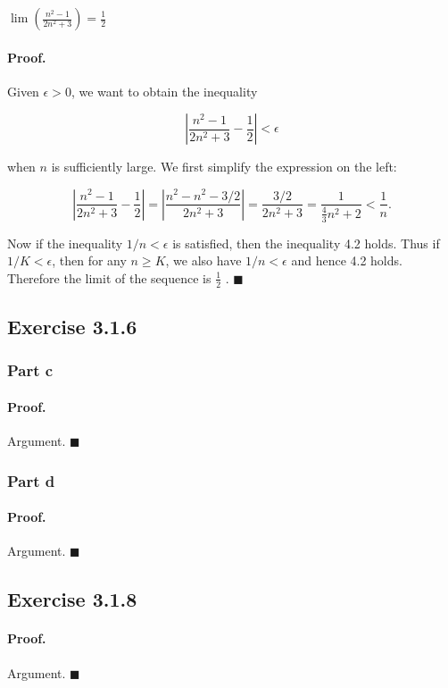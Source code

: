 \documentclass[paper=a4, fontsize=11pt]{scrartcl} %
\numberwithin{equation}{section} %
\numberwithin{figure}{section} %
\numberwithin{table}{section} %
\begin{document}
$\lim\left(\frac{n^2 - 1}{2n^2 + 3}\right) = \frac{1}{2}$

\paragraph{Proof.} Given $\epsilon > 0$, we want to obtain the inequality

\begin{equation}
\left| \frac{n^2 - 1}{2n^2 + 3} - \frac{1}{2}\right| < \epsilon
\end{equation}

when $n$ is sufficiently large. We first simplify the expression on the left:

\begin{equation*}
\left| \frac{n^2 - 1}{2n^2 + 3} - \frac{1}{2}\right| = \left|\frac{n^2 - n^2 - 3/2}{2n^2 + 3}\right| = \frac{3/2}{2n^2 + 3} = \frac{1}{\frac{4}{3}n^2 + 2} < \frac{1}{n}.
\end{equation*}

Now if the inequality $1/n < \epsilon$ is satisfied, then the inequality 4.2 holds. Thus if $1/K < \epsilon$, then for any $n \geq K$, we also have $1/n < \epsilon$ and hence 4.2 holds. Therefore the limit of the sequence is $\frac{1}{2}$ . $\blacksquare$\\

\subsection*{Exercise 3.1.6}
\subsubsection*{Part c}
\paragraph{Proof.} Argument. $\blacksquare$\\
\subsubsection*{Part d}
\paragraph{Proof.} Argument. $\blacksquare$\\

\subsection*{Exercise 3.1.8}
\paragraph{Proof.} Argument. $\blacksquare$\\
\end{document}
